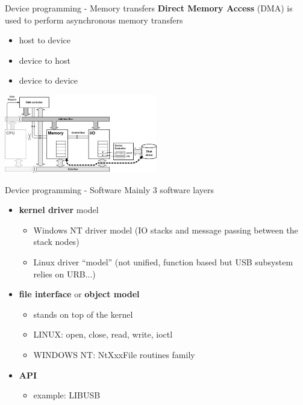 \begin{frame}{Device programming - Memory transfers}
  \textbf{Direct Memory Access} (DMA) is used to perform asynchronous memory transfers
  \begin{itemize}
  \item host to device
  \item device to host
  \item device to device
  \end{itemize}

  \smallskip
  \begin{center}
    \includegraphics[width=0.5\textwidth]{figures/misc_dma.jpg}
  \end{center}
\end{frame}

\begin{frame}{Device programming - Software}
  Mainly 3 software layers

  \begin{itemize}
  \item \textbf{kernel driver} model
    \begin{itemize}
    \item Windows NT driver model (IO stacks and message passing between the stack nodes)
    \item Linux driver ``model'' (not unified, function based but USB subsystem relies on URB...)
    \end{itemize}

  \item \textbf{file interface} or \textbf{object model}
    \begin{itemize}
    \item stands on top of the kernel
    \item LINUX: open, close, read, write, ioctl
    \item WINDOWS NT: NtXxxFile routines family
    \end{itemize}

  \item \textbf{API}
    \begin{itemize}
    \item example: LIBUSB
    \end{itemize}

  \end{itemize}

\end{frame}

